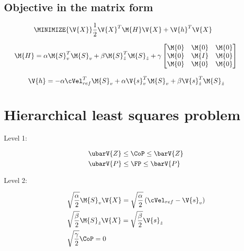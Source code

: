 \subsection{Objective in the matrix form}
\begin{equation}
\begin{split}
    \MINIMIZE{\V{X}}    & \frac{1}{2} \V{X}^T\M{H}\V{X} + \V{h}^T \V{X}
\end{split}
\end{equation}

\begin{equation}
    \M{H} =
        \alpha \M{S}_v^T \M{S}_v
        +
        \beta  \M{S}_{\dot{z}}^T \M{S}_{\dot{z}}
        +
        \gamma
            \begin{bmatrix}
                \M{0} & \M{0} & \M{0}\\
                \M{0} & \M{I} & \M{0}\\
                \M{0} & \M{0} & \M{0}\\
            \end{bmatrix}\\
\end{equation}

\begin{equation}
    \V{h} =
        -
        \alpha \cVel_{ref}^T \M{S}_v
        +
        \alpha \V{s}_v^T \M{S}_v
        +
        \beta  \V{s}_{\dot{z}}^T \M{S}_{\dot{z}}
\end{equation}




\section{Hierarchical least squares problem}
\begin{description}
    \item[Level 1:]
        \begin{equation}
        \begin{split}
            & \ubarV{Z} \le \CoP \le \barV{Z} \\
            & \ubarV{P} \le \FP \le \barV{P}
        \end{split}
        \end{equation}

    \item[Level 2:]
        \begin{equation}
        \begin{split}
            & \sqrt{\frac{\alpha}{2}} \M{S}_v \V{X} = \sqrt{\frac{\alpha}{2}} \left(\cVel_{ref} - \V{s}_v\right) \\
            & \sqrt{\frac{\beta}{2}} \M{S}_{\dot{z}} \V{X} = \sqrt{\frac{\beta}{2}} \V{s}_{\dot{z}}\\
            & \sqrt{\frac{\gamma}{2}} \CoP = 0\\
        \end{split}
        \end{equation}
\end{description}


